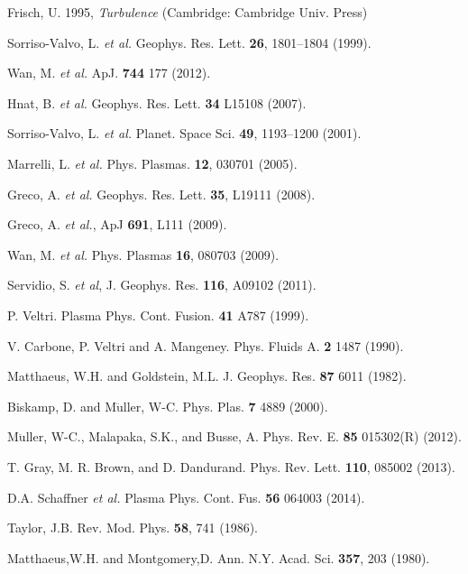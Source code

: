 \documentclass[aps,prl,amsmath,amssymb,reprint,superscriptaddress]{revtex4-1} %
\begin{document}
\providecommand{\noopsort}[1]{}\providecommand{\singleletter}[1]{#1}%
\begin{thebibliography}{99}

Frisch, U. 1995, {\it Turbulence} (Cambridge: Cambridge Univ. Press)

Sorriso-Valvo, L. {\it et al.} Geophys. Res. Lett. {\bf 26}, 1801–1804 (1999).

Wan, M. {\it et al.} ApJ. {\bf 744} 177 (2012).

Hnat, B. {\it et al.} Geophys. Res. Lett. {\bf 34} L15108 (2007).

Sorriso-Valvo, L. {\it et al.} Planet. Space Sci. {\bf 49}, 1193–1200 (2001).

Marrelli, L. {\it et al.} Phys. Plasmas. {\bf 12}, 030701 (2005).

Greco, A. {\it et al.} Geophys. Res. Lett. {\bf 35}, L19111 (2008).

Greco, A. {\it et al.}, ApJ {\bf 691}, L111 (2009).

Wan, M. {\it et al.} Phys. Plasmas {\bf 16}, 080703 (2009).

Servidio, S. {\it et al}, J. Geophys. Res. {\bf 116}, A09102 (2011).

P. Veltri. Plasma Phys. Cont. Fusion. {\bf 41} A787 (1999).

V. Carbone, P. Veltri and A. Mangeney. Phys. Fluids A. {\bf 2} 1487 (1990).

Matthaeus, W.H. and Goldstein, M.L. J. Geophys. Res. {\bf 87} 6011 (1982).

Biskamp, D. and M$\ddot{\mathrm{u}}$ller, W-C. Phys. Plas. {\bf 7} 4889 (2000).

M$\ddot{\mathrm{u}}$ller, W-C., Malapaka, S.K., and Busse, A. Phys. Rev. E. {\bf 85} 015302(R) (2012).

T. Gray, M. R. Brown, and D. Dandurand. Phys. Rev. Lett. {\bf 110}, 085002 (2013). 

D.A. Schaffner {\it et al.} Plasma Phys. Cont. Fus. {\bf 56} 064003 (2014).

Taylor, J.B. Rev. Mod. Phys. {\bf 58}, 741 (1986).

Matthaeus,W.H. and Montgomery,D. Ann. N.Y. Acad. Sci. {\bf 357}, 203 (1980).


\end{thebibliography}
\end{document}
